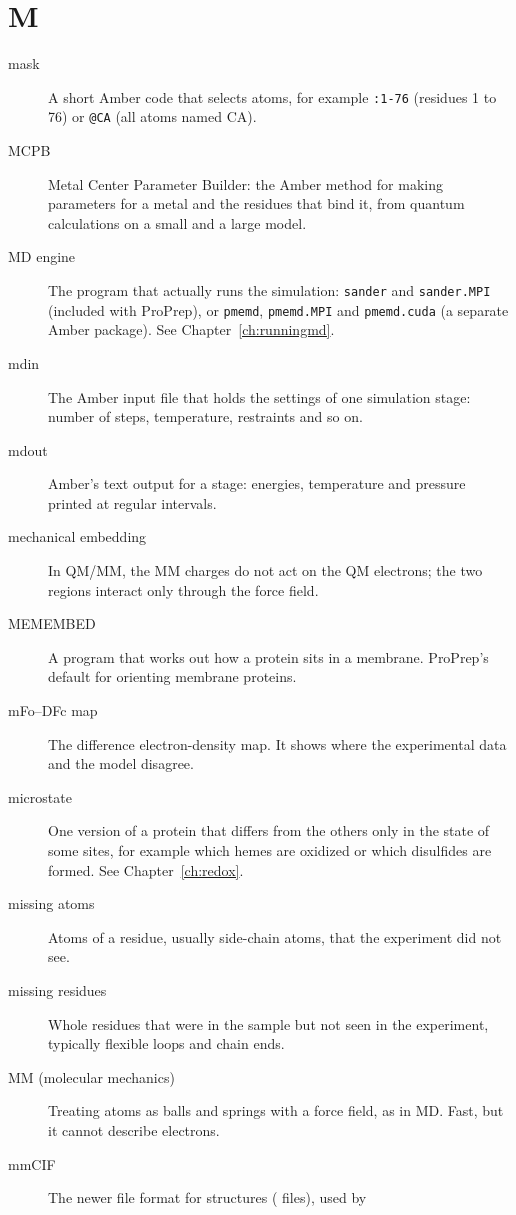 \section*{M}

\begin{description}
\item[mask] A short Amber code that selects atoms, for example \texttt{:1-76}
  (residues 1 to 76) or \texttt{@CA} (all atoms named CA).
\item[MCPB] Metal Center Parameter Builder: the Amber method for making
  parameters for a metal and the residues that bind it, from quantum
  calculations on a small and a large model.
\item[MD engine] The program that actually runs the simulation:
  \texttt{sander} and \texttt{sander.MPI} (included with ProPrep), or
  \texttt{pmemd}, \texttt{pmemd.MPI} and \texttt{pmemd.cuda} (a separate Amber
  package). See Chapter~\ref{ch:runningmd}.
\item[mdin] The Amber input file that holds the settings of one simulation
  stage: number of steps, temperature, restraints and so on.
\item[mdout] Amber's text output for a stage: energies, temperature and
  pressure printed at regular intervals.
\item[mechanical embedding] In QM/MM, the MM charges do not act on the QM
  electrons; the two regions interact only through the force field.
\item[MEMEMBED] A program that works out how a protein sits in a membrane.
  ProPrep's default for orienting membrane proteins.
\item[mFo--DFc map] The difference electron-density map. It shows where the
  experimental data and the model disagree.
\item[microstate] One version of a protein that differs from the others only
  in the state of some sites, for example which hemes are oxidized or which
  disulfides are formed. See Chapter~\ref{ch:redox}.
\item[missing atoms] Atoms of a residue, usually side-chain atoms, that the
  experiment did not see.
\item[missing residues] Whole residues that were in the sample but not seen in
  the experiment, typically flexible loops and chain ends.
\item[MM (molecular mechanics)] Treating atoms as balls and springs with a
  force field, as in MD. Fast, but it cannot describe electrons.
\item[mmCIF] The newer file format for structures ( files), used by

\end{description}
